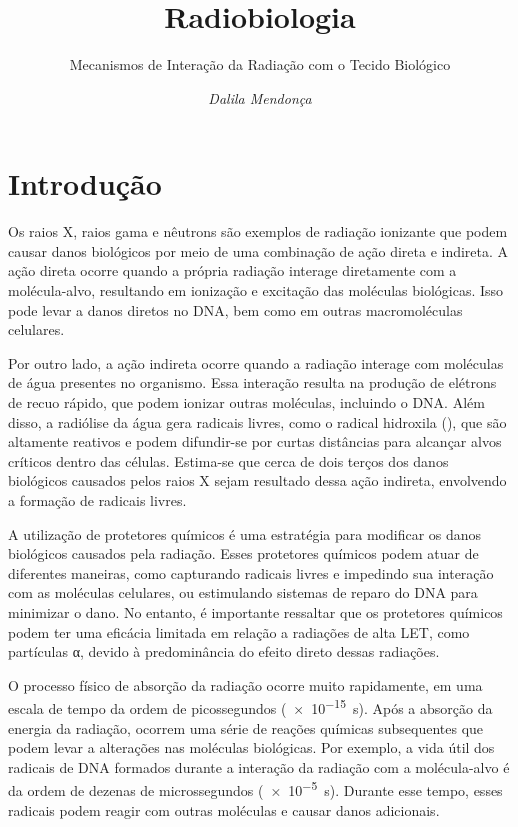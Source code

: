 \documentclass[11pt,a4paper]{article}
\title{\LobsterTwo\Huge{Radiobiologia}}
\author{\LobsterTwo\Large{Mecanismos de Interação da Radiação com o Tecido Biológico}\nocite{*}}
\date{\LobsterTwo\textit{Dalila Mendonça}}
\newcounter{exemplo}
\begin{document}
	\maketitle

\section{Introdução}

    Os raios X, raios gama e nêutrons são exemplos de radiação ionizante que podem causar danos biológicos por meio de uma combinação de ação direta e indireta. A ação direta ocorre quando a própria radiação interage diretamente com a molécula-alvo, resultando em ionização e excitação das moléculas biológicas. Isso pode levar a danos diretos no DNA, bem como em outras macromoléculas celulares.

    Por outro lado, a ação indireta ocorre quando a radiação interage com moléculas de água presentes no organismo. Essa interação resulta na produção de elétrons de recuo rápido, que podem ionizar outras moléculas, incluindo o DNA. Além disso, a radiólise da água gera radicais livres, como o radical hidroxila (), que são altamente reativos e podem difundir-se por curtas distâncias para alcançar alvos críticos dentro das células. Estima-se que cerca de dois terços dos danos biológicos causados pelos raios X sejam resultado dessa ação indireta, envolvendo a formação de radicais livres.

    A utilização de protetores químicos é uma estratégia para modificar os danos biológicos causados pela radiação. Esses protetores químicos podem atuar de diferentes maneiras, como capturando radicais livres e impedindo sua interação com as moléculas celulares, ou estimulando sistemas de reparo do DNA para minimizar o dano. No entanto, é importante ressaltar que os protetores químicos podem ter uma eficácia limitada em relação a radiações de alta LET, como partículas α, devido à predominância do efeito direto dessas radiações.

    O processo físico de absorção da radiação ocorre muito rapidamente, em uma escala de tempo da ordem de picossegundos (\SI{e-15}{\second}). Após a absorção da energia da radiação, ocorrem uma série de reações químicas subsequentes que podem levar a alterações nas moléculas biológicas. Por exemplo, a vida útil dos radicais de DNA formados durante a interação da radiação com a molécula-alvo é da ordem de dezenas de microssegundos (\SI{e-5}{\second}). Durante esse tempo, esses radicais podem reagir com outras moléculas e causar danos adicionais.
\end{document}
